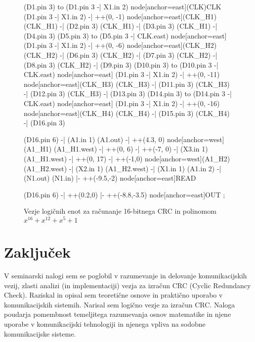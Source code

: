 \documentclass[12pt]{article}
\begin{document}
\begin{figure}[h!]
\begin{center}
\begin{circuitikz}[/tikz/circuitikz/bipoles/length=1.1cm]
                (D1.pin 3) to (D1.pin 3 -| X1.in 2) node[anchor=east](CLK){CLK}
                (D1.pin 3 -| X1.in 2) -| ++(0, -1) node[anchor=east](CLK_H1){}
                (CLK_H1) -| (D2.pin 3)
                (CLK_H1) -| (D3.pin 3)
                (CLK_H1) -| (D4.pin 3)
                (D5.pin 3) to (D5.pin 3 -| CLK.east) node[anchor=east]{}
                (D1.pin 3 -| X1.in 2) -| ++(0, -6) node[anchor=east](CLK_H2){}
                (CLK_H2) -| (D6.pin 3)
                (CLK_H2) -| (D7.pin 3)
                (CLK_H2) -| (D8.pin 3)
                (CLK_H2) -| (D9.pin 3)
                (D10.pin 3) to (D10.pin 3 -| CLK.east) node[anchor=east]{}
                (D1.pin 3 -| X1.in 2) -| ++(0, -11) node[anchor=east](CLK_H3){}
                (CLK_H3) -| (D11.pin 3)
                (CLK_H3) -| (D12.pin 3)
                (CLK_H3) -| (D13.pin 3)
                (D14.pin 3) to (D14.pin 3 -| CLK.east) node[anchor=east]{}
                (D1.pin 3 -| X1.in 2) -| ++(0, -16) node[anchor=east](CLK_H4){}
                (CLK_H4) -| (D15.pin 3)
                (CLK_H4) -| (D16.pin 3)
                
                (D16.pin 6) -| (A1.in 1)
                (A1.out) -| ++(4.3, 0) node[anchor=west](A1_H1){}
                (A1_H1.west) -| ++(0, 6) -| ++(-7, 0) -| (X3.in 1)
                (A1_H1.west) -| ++(0, 17) -| ++(-1,0) node[anchor=west](A1_H2){}
                (A1_H2.west) -| (X2.in 1) 
                (A1_H2.west) -| (X1.in 1) 
                (A1.in 2) -| (N1.out)
                (N1.in) |- ++(-9.5,-2) node[anchor=east]{READ}

                (D16.pin 6) -| ++(0.2,0) |- ++(-8.8,-3.5) node[anchor=east]{OUT}              
                ;
            \end{circuitikz}
            \caption{Vezje logičnih enot za računanje 16-bitnega CRC in 
            polinomom $x^{16} + x^{12} + x^5 + 1$}
            \label{fig:vezje1}
        \end{center}
    \end{figure}

\newpage
\section{Zaključek}
V seminarski nalogi sem se poglobil v razumevanje in delovanje komunikacijskih vezij, 
zlasti  analizi (in implementaciji) vezja za izračun CRC (Cyclic Redundancy Check). 
Raziskal in opisal sem teoretične osnove in praktično uporabo v komunikacijskih sistemih.
Narisal sem logično vezje za izračun CRC. Naloga poudarja pomembnost temeljitega 
razumevanja osnov matematike in njene uporabe v komunikacijski tehnologiji in njenega
vpliva na sodobne komunikacijske sisteme.
\end{document}

